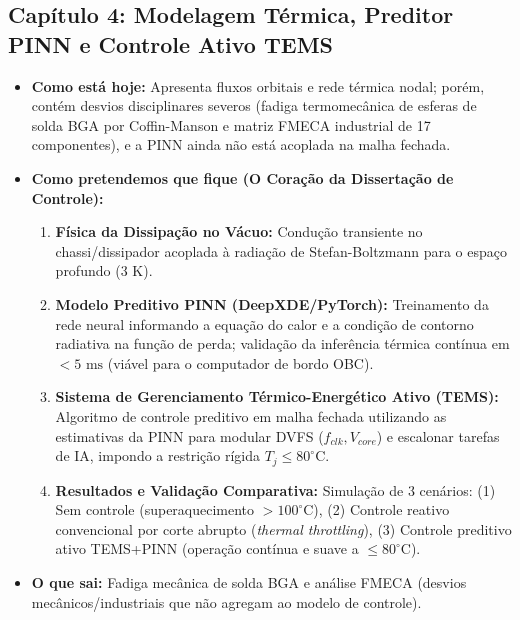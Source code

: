 \documentclass[11pt,a4paper]{article}
\begin{document}
\subsection*{Capítulo 4: Modelagem Térmica, Preditor PINN e Controle Ativo TEMS}
\begin{itemize}[leftmargin=1.2em, itemsep=2pt, parsep=0pt]
    \item \textbf{Como está hoje:} Apresenta fluxos orbitais e rede térmica nodal; porém, contém desvios disciplinares severos (fadiga termomecânica de esferas de solda BGA por Coffin-Manson e matriz FMECA industrial de 17 componentes), e a PINN ainda não está acoplada na malha fechada.
    \item \textbf{Como pretendemos que fique (O Coração da Dissertação de Controle):}
    \begin{enumerate}[label=\alph*., itemsep=1pt, parsep=0pt]
        \item \textbf{Física da Dissipação no Vácuo:} Condução transiente no chassi/dissipador acoplada à radiação de Stefan-Boltzmann para o espaço profundo ($3\text{ K}$).
        \item \textbf{Modelo Preditivo PINN (DeepXDE/PyTorch):} Treinamento da rede neural informando a equação do calor e a condição de contorno radiativa na função de perda; validação da inferência térmica contínua em $< 5\text{ ms}$ (viável para o computador de bordo OBC).
        \item \textbf{Sistema de Gerenciamento Térmico-Energético Ativo (TEMS):} Algoritmo de controle preditivo em malha fechada utilizando as estimativas da PINN para modular DVFS ($f_{clk}, V_{core}$) e escalonar tarefas de IA, impondo a restrição rígida $T_j \le 80^\circ\text{C}$.
        \item \textbf{Resultados e Validação Comparativa:} Simulação de 3 cenários: (1) Sem controle (superaquecimento $> 100^\circ\text{C}$), (2) Controle reativo convencional por corte abrupto (\textit{thermal throttling}), (3) Controle preditivo ativo TEMS+PINN (operação contínua e suave a $\le 80^\circ\text{C}$).
    \end{enumerate}
    \item \textbf{O que sai:} Fadiga mecânica de solda BGA e análise FMECA (desvios mecânicos/industriais que não agregam ao modelo de controle).
\end{itemize}
\end{document}

